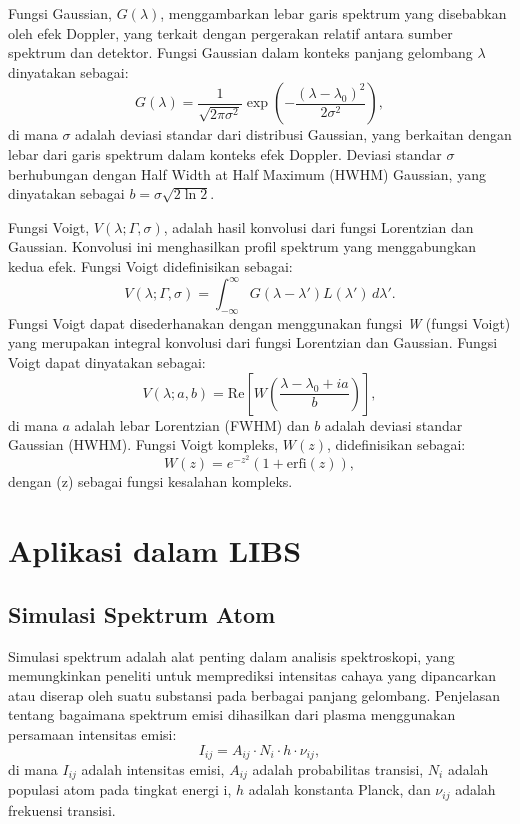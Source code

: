 Fungsi Gaussian, \( G(\lambda) \), menggambarkan lebar garis spektrum yang disebabkan oleh efek Doppler, yang terkait dengan pergerakan relatif antara sumber spektrum dan detektor. Fungsi Gaussian dalam konteks panjang gelombang \( \lambda \) dinyatakan sebagai:
\begin{equation}
G(\lambda) = \frac{1}{\sqrt{2\pi \sigma^2}} \exp\left(-\frac{(\lambda - \lambda_0)^2}{2\sigma^2}\right),
\end{equation}
di mana \( \sigma \) adalah deviasi standar dari distribusi Gaussian, yang berkaitan dengan lebar dari garis spektrum dalam konteks efek Doppler. Deviasi standar \( \sigma \) berhubungan dengan Half Width at Half Maximum (HWHM) Gaussian, yang dinyatakan sebagai \( b = \sigma \sqrt{2 \ln 2} \).

Fungsi Voigt, \( V(\lambda; \Gamma, \sigma) \), adalah hasil konvolusi dari fungsi Lorentzian dan Gaussian. Konvolusi ini menghasilkan profil spektrum yang menggabungkan kedua efek. Fungsi Voigt didefinisikan sebagai:
\begin{equation}
V(\lambda; \Gamma, \sigma) = \int_{-\infty}^{\infty} G(\lambda - \lambda') L(\lambda') \, d\lambda'.
\end{equation}
Fungsi Voigt dapat disederhanakan dengan menggunakan fungsi \textit{W} (fungsi Voigt) yang merupakan integral konvolusi dari fungsi Lorentzian dan Gaussian. Fungsi Voigt dapat dinyatakan sebagai:
\begin{equation}
V(\lambda; a, b) = \text{Re} \left[ W\left(\frac{\lambda - \lambda_0 + i a}{b}\right) \right],
\end{equation}
di mana \( a \) adalah lebar Lorentzian (FWHM) dan \( b \) adalah deviasi standar Gaussian (HWHM). Fungsi Voigt kompleks, \( W(z) \), didefinisikan sebagai:
\begin{equation}
W(z) = e^{-z^2} \left( 1 + \text{erfi}(z) \right),
\end{equation}
dengan (z) sebagai fungsi kesalahan kompleks.

\section{Aplikasi dalam LIBS}
\subsection{Simulasi Spektrum Atom}
Simulasi spektrum adalah alat penting dalam analisis spektroskopi, yang memungkinkan peneliti untuk memprediksi intensitas cahaya yang dipancarkan atau diserap oleh suatu substansi pada berbagai panjang gelombang. Penjelasan tentang bagaimana spektrum emisi dihasilkan dari plasma menggunakan persamaan intensitas emisi:
\begin{equation}
I_{ij} = A_{ij} \cdot N_i \cdot h \cdot \nu_{ij},
\end{equation}
di mana $I_{ij}$ adalah intensitas emisi, $A_{ij}$ adalah probabilitas transisi, $N_i$ adalah populasi atom pada tingkat energi i, $h$ adalah konstanta Planck, dan $\nu_{ij}$ adalah frekuensi transisi.

